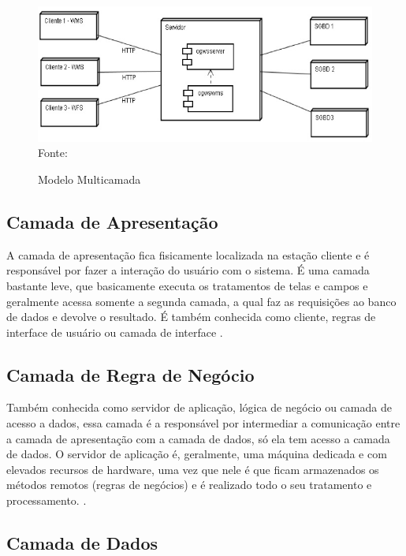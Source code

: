 \begin{figure}[!htpb]
	\centering
	\caption{Modelo Multicamada}
	\label{f_c2_multicamada}
	\includegraphics[width=14cm]{images/multicamada.jpg}\\
    Fonte: \cite{diegomacedoArqApp}
 
\end{figure}

\subsection{Camada de Apresentação}

A camada de apresentação fica fisicamente localizada na estação cliente e é responsável por fazer a interação do usuário com o sistema. É uma camada bastante leve, que basicamente executa os tratamentos de telas e campos e geralmente acessa somente a segunda camada, a qual faz as requisições ao banco de dados e devolve o resultado. É também conhecida como cliente, regras de interface de usuário ou camada de interface \cite{devmediaMultiCamada2018}.

\subsection{Camada de Regra de Negócio}

Também conhecida como servidor de aplicação, lógica de negócio ou camada de acesso a dados, essa camada é a responsável por intermediar a comunicação entre a camada de apresentação com a camada de dados, só ela tem acesso a camada de dados. O servidor de aplicação é, geralmente, uma máquina dedicada e com elevados recursos de hardware, uma vez que nele é que ficam armazenados os métodos remotos (regras de negócios) e é realizado todo o seu tratamento e processamento. \cite{devmediaMultiCamada2018}.

\subsection{Camada de Dados}

